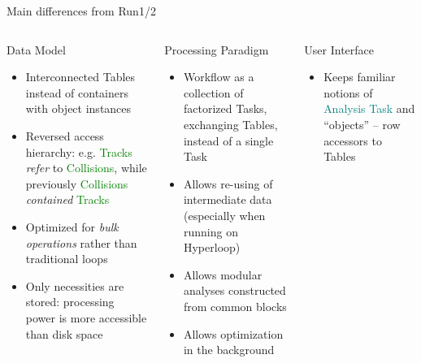 \documentclass[10pt,lualatex,xcolor={table,svgnames},{hyperref={bookmarks=true,linktoc=all}},aspectratio=169]{beamer}
\newcommand{\logical}[1]{\textcolor{Green}{#1}}
\newcommand{\programmatic}[1]{\textcolor{-green!40!yellow}{#1}}
\newcommand{\notion}[1]{\textcolor{teal}{#1}}
\begin{document}
\begin{frame}[shrink=14]{Main differences from Run1/2}
    \vspace{2ex}
    \begin{columns}
        \begin{column}{0.32\textwidth}
            \begin{block}{Data Model}
                \begin{itemize}
                    \item Interconnected Tables instead of containers with object instances
                    \item Reversed access hierarchy: e.g. \logical{Tracks} \emph{refer} to \logical{Collisions}, while previously \logical{Collisions} \emph{contained} \logical{Tracks}
                    \item Optimized for \emph{bulk operations} rather than traditional loops
                    \item Only necessities are stored: processing power is more accessible than disk space
                \end{itemize}
                \smallskip
            \end{block}
        \end{column}
        \begin{column}{0.32\textwidth}
            \begin{block}{Processing Paradigm}
                \begin{itemize}
                    \item \programmatic{Workflow} as a collection of factorized \programmatic{Tasks}, exchanging \programmatic{Tables}, instead of a single Task
                    \item Allows re-using of intermediate data (especially when running on \programmatic{Hyperloop})
                    \item Allows modular analyses constructed from common blocks
                    \item Allows optimization in the background
                \end{itemize}
                \smallskip
            \end{block}
        \end{column}
        \begin{column}{0.32\textwidth}
            \begin{block}{User Interface}
                \begin{itemize}
                    \item Keeps familiar notions of \notion{Analysis Task} and \enquote{objects} -- row accessors to \programmatic{Tables}

\end{itemize}
\end{block}
\end{column}
\end{columns}
\end{frame}
\end{document}
